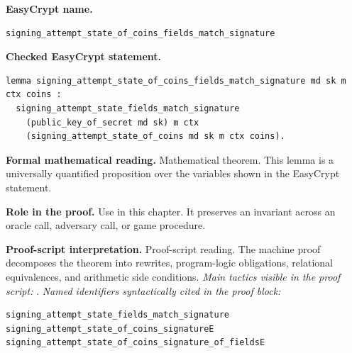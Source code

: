 \begin{formaltheorem}
\noindent\textbf{EasyCrypt name.}
\begin{lstlisting}[language=EasyCrypt,basicstyle=\ttfamily\scriptsize]
signing_attempt_state_of_coins_fields_match_signature
\end{lstlisting}
\noindent\textbf{Checked EasyCrypt statement.}
\begin{lstlisting}[language=EasyCrypt,basicstyle=\ttfamily\scriptsize]
lemma signing_attempt_state_of_coins_fields_match_signature md sk m ctx coins :
  signing_attempt_state_fields_match_signature
    (public_key_of_secret md sk) m ctx
    (signing_attempt_state_of_coins md sk m ctx coins).
\end{lstlisting}
\noindent\textbf{Formal mathematical reading.}
Mathematical theorem. This lemma is a universally quantified proposition over the variables shown in the EasyCrypt statement.

\noindent\textbf{Role in the proof.}
Use in this chapter. It preserves an invariant across an oracle call, adversary call, or game procedure.

\noindent\textbf{Proof-script interpretation.}
Proof-script reading. The machine proof decomposes the theorem into rewrites, program-logic obligations, relational equivalences, and arithmetic side conditions.
\emph{Main tactics visible in the proof script:} .
\emph{Named identifiers syntactically cited in the proof block:}
\begin{lstlisting}[language=EasyCrypt,basicstyle=\ttfamily\scriptsize]
signing_attempt_state_fields_match_signature
signing_attempt_state_of_coins_signatureE
signing_attempt_state_of_coins_signature_of_fieldsE
\end{lstlisting}

\end{formaltheorem}


